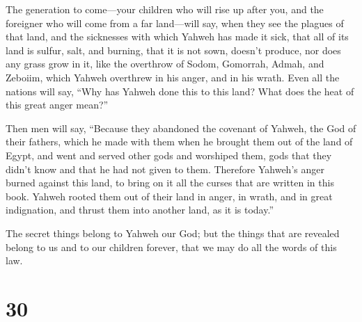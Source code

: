  The generation to come---your children who will rise up
after you, and the foreigner who will come from a far land---will say,
when they see the plagues of that land, and the sicknesses with which
Yahweh has made it sick,  that all of its land is sulfur,
salt, and burning, that it is not sown, doesn't produce, nor does any
grass grow in it, like the overthrow of Sodom, Gomorrah, Admah, and
Zeboiim, which Yahweh overthrew in his anger, and in his wrath.
 Even all the nations will say, ``Why has Yahweh done this
to this land? What does the heat of this great anger mean?''

 Then men will say, ``Because they abandoned the covenant
of Yahweh, the God of their fathers, which he made with them when he
brought them out of the land of Egypt,  and went and served
other gods and worshiped them, gods that they didn't know and that he
had not given to them.  Therefore Yahweh's anger burned
against this land, to bring on it all the curses that are written in
this book.  Yahweh rooted them out of their land in anger,
in wrath, and in great indignation, and thrust them into another land,
as it is today.''

 The secret things belong to Yahweh our God; but the things
that are revealed belong to us and to our children forever, that we may
do all the words of this law.

\hypertarget{section-29}{%
\section{30}\label{section-29}}

